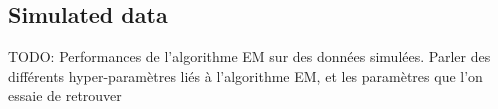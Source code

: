 \subsection{Simulated data}

TODO: Performances de l'algorithme EM sur des données simulées.
Parler des différents hyper-paramètres liés à l'algorithme EM, et les paramètres que l'on essaie de retrouver